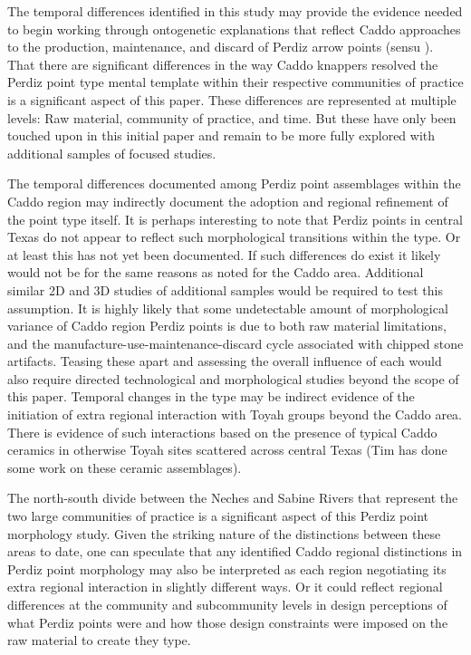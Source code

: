 \documentclass[review]{elsarticle}
\begin{document}
The temporal differences identified in this study may provide the evidence needed to begin working through ontogenetic explanations that reflect Caddo approaches to the production, maintenance, and discard of Perdiz arrow points (sensu \citealt{RN5871}). That there are significant differences in the way Caddo knappers resolved the Perdiz point type mental template within their respective communities of practice is a significant aspect of this paper. These differences are represented at multiple levels: Raw material, community of practice, and time. But these have only been touched upon in this initial paper and remain to be more fully explored with additional samples of focused studies.

The temporal differences documented among Perdiz point assemblages within the Caddo region may indirectly document the adoption and regional refinement of the point type itself. It is perhaps interesting to note that Perdiz points in central Texas do not appear to reflect such morphological transitions within the type. Or at least this has not yet been documented. If such differences do exist it likely would not be for the same reasons as noted for the Caddo area. Additional similar 2D and 3D studies of additional samples would be required to test this assumption. It is highly likely that some undetectable amount of morphological variance of Caddo region Perdiz points is due to both raw material limitations, and the manufacture-use-maintenance-discard cycle associated with chipped stone artifacts. Teasing these apart and assessing the overall influence of each would also require directed technological and morphological studies beyond the scope of this paper. Temporal changes in the type may be indirect evidence of the initiation of extra regional interaction with Toyah groups beyond the Caddo area. There is evidence of such interactions based on the presence of typical Caddo ceramics in otherwise Toyah sites scattered across central Texas (Tim has done some work on these ceramic assemblages). 

The north-south divide between the Neches and Sabine Rivers that represent the two large communities of practice is a significant aspect of this Perdiz point morphology study. Given the striking nature of the distinctions between these areas to date, one can speculate that any identified Caddo regional distinctions in Perdiz point morphology may also be interpreted as each region negotiating its extra regional interaction in slightly different ways. Or it could reflect regional differences at the community and subcommunity levels in design perceptions of what Perdiz points were and how those design constraints were imposed on the raw material to create they type.
\end{document}
